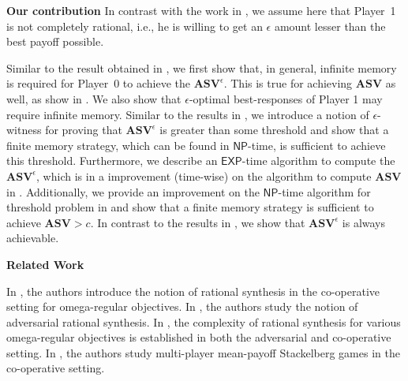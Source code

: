 \textbf{\bf Our contribution} 
In contrast with the work in \cite{FGR20}, we assume here that Player~1 is not completely rational, i.e., he is willing to get an $\epsilon$ amount lesser than the best payoff possible. 

Similar to the result obtained in \cite{FGR20}, we first show that, in general, infinite memory is required for Player~0 to achieve the $\mathbf{ASV}^{\epsilon}$. This is true for achieving $\mathbf{ASV}$ as well, as show in \cite{FGR20}. We also show that $\epsilon$-optimal best-responses of Player 1 may require infinite memory. Similar to the results in \cite{FGR20}, we introduce a notion of $\epsilon$-witness for proving that $\mathbf{ASV}^{\epsilon}$ is greater than some threshold and show that a finite memory strategy, which can be found in $\mathsf{NP}$-time, is sufficient to achieve this threshold. Furthermore, we describe an $\mathsf{EXP}$-time algorithm to compute the $\mathbf{ASV}^{\epsilon}$, which is in a improvement (time-wise) on the algorithm to compute $\mathbf{ASV}$ in \cite{FGR20}. Additionally, we provide an improvement on the $\mathsf{NP}$-time algorithm for threshold problem in \cite{FGR20} and show that a finite memory strategy is sufficient to achieve $\mathbf{ASV} > c$. In contrast to the results in \cite{FGR20}, we show that $\mathbf{ASV}^{\epsilon}$ is always achievable.

\textbf{Related Work} 

In \cite{FKL10}, the authors introduce the notion of rational synthesis in the co-operative setting for omega-regular objectives. In \cite{KPV16}, the authors study the notion of adversarial rational synthesis. In \cite{CFGR16}, the complexity of rational synthesis for various omega-regular objectives is established in both the adversarial and co-operative setting. In \cite{GS14}, the authors study multi-player mean-payoff Stackelberg games in the co-operative setting.


